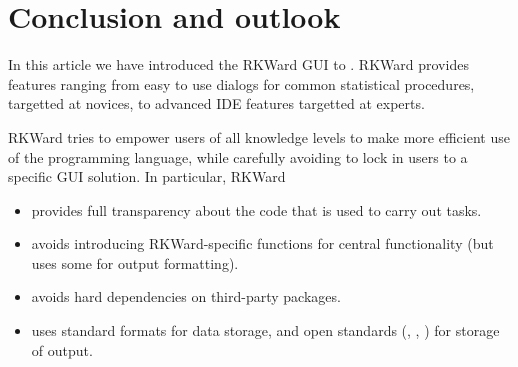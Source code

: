 \section{Conclusion and outlook}
\label{sec:conclusion_summary}
In this article we have introduced the RKWard GUI to . RKWard provides features ranging
from easy to use dialogs for common statistical procedures, targetted at  novices, to advanced
IDE features targetted at  experts.

RKWard tries to empower users of all knowledge levels to make more efficient use of the 
 programming language, while carefully avoiding to lock in users to a specific
GUI solution. In particular, RKWard
\begin{itemize}
 \item provides full transparency about the  code that is used to carry out tasks.
 \item avoids introducing RKWard-specific  functions for central functionality (but uses some for output formatting).
 \item avoids hard dependencies on third-party  packages.
 \item uses standard  formats \citep[cf.][]{RDCT2010c} for data storage, and open standards (, , ) for storage of output.
\end{itemize}


